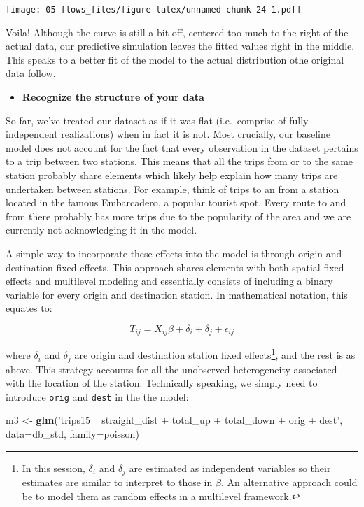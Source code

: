 \documentclass[
]{book}
\newenvironment{Shaded}{\begin{snugshade}}{\end{snugshade}}
\newcommand{\DataTypeTok}[1]{\textcolor[rgb]{0.13,0.29,0.53}{#1}}
\newcommand{\KeywordTok}[1]{\textcolor[rgb]{0.13,0.29,0.53}{\textbf{#1}}}
\newcommand{\NormalTok}[1]{#1}
\newcommand{\StringTok}[1]{\textcolor[rgb]{0.31,0.60,0.02}{#1}}
\providecommand{\tightlist}{%
  \setlength{\itemsep}{0pt}\setlength{\parskip}{0pt}}
\begin{document}
\texttt{[image: 05-flows\_files/figure-latex/unnamed-chunk-24-1.pdf]}

Voila! Although the curve is still a bit off, centered too much to the right of the actual data, our predictive simulation leaves the fitted values right in the middle. This speaks to a better fit of the model to the actual distribution othe original data follow.

\begin{itemize}
\tightlist
\item
  \textbf{Recognize the structure of your data}
\end{itemize}

So far, we've treated our dataset as if it was flat (i.e.~comprise of fully independent realizations) when in fact it is not. Most crucially, our baseline model does not account for the fact that every observation in the dataset pertains to a trip between two stations. This means that all the trips from or to the same station probably share elements which likely help explain how many trips are undertaken between stations. For example, think of trips to an from a station located in the famous Embarcadero, a popular tourist spot. Every route to and from there probably has more trips due to the popularity of the area and we are currently not acknowledging it in the model.

A simple way to incorporate these effects into the model is through origin and destination fixed effects. This approach shares elements with both spatial fixed effects and multilevel modeling and essentially consists of including a binary variable for every origin and destination station. In mathematical notation, this equates to:

\[
T_{ij} = X_{ij}\beta + \delta_i + \delta_j + \epsilon_{ij}
\]

where \(\delta_i\) and \(\delta_j\) are origin and destination station fixed effects\footnote{In this session, \(\delta_i\) and \(\delta_j\) are estimated as independent variables so their estimates are similar to interpret to those in \(\beta\). An alternative approach could be to model them as random effects in a multilevel framework.}, and the rest is as above. This strategy accounts for all the unobserved heterogeneity associated with the location of the station. Technically speaking, we simply need to introduce \texttt{orig} and \texttt{dest} in the the model:

\begin{Shaded}
\begin{Highlighting}[]
\NormalTok{m3 <-}\StringTok{ }\KeywordTok{glm}\NormalTok{(}\StringTok{'trips15 ~ straight_dist + total_up + total_down + orig + dest'}\NormalTok{, }
          \DataTypeTok{data=}\NormalTok{db_std,}
          \DataTypeTok{family=}\NormalTok{poisson)}
\end{Highlighting}
\end{Shaded}
\end{document}
